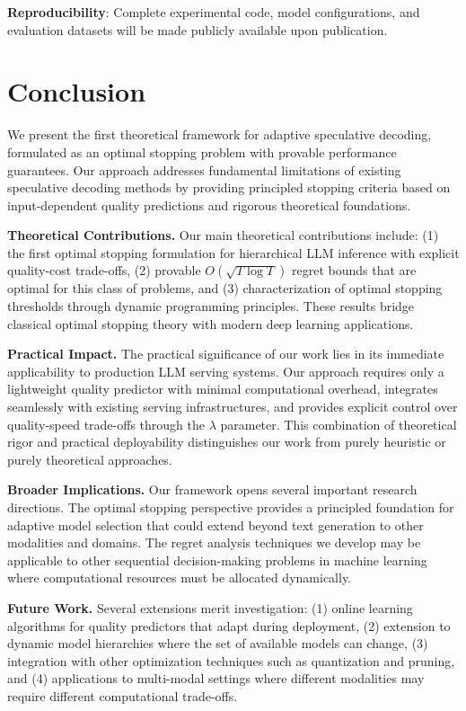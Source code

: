 \documentclass{article}
\theoremstyle{plain}
\theoremstyle{definition}
\theoremstyle{remark}
\begin{document}
\textbf{Reproducibility}: Complete experimental code, model configurations, and evaluation datasets will be made publicly available upon publication.



\section{Conclusion}
\label{sec:conclusion}
We present the first theoretical framework for adaptive speculative decoding, formulated as an optimal stopping problem with provable performance guarantees. Our approach addresses fundamental limitations of existing speculative decoding methods by providing principled stopping criteria based on input-dependent quality predictions and rigorous theoretical foundations.

\textbf{Theoretical Contributions.} Our main theoretical contributions include: (1) the first optimal stopping formulation for hierarchical LLM inference with explicit quality-cost trade-offs, (2) provable $O(\sqrt{T \log T})$ regret bounds that are optimal for this class of problems, and (3) characterization of optimal stopping thresholds through dynamic programming principles. These results bridge classical optimal stopping theory with modern deep learning applications.

\textbf{Practical Impact.} The practical significance of our work lies in its immediate applicability to production LLM serving systems. Our approach requires only a lightweight quality predictor with minimal computational overhead, integrates seamlessly with existing serving infrastructures, and provides explicit control over quality-speed trade-offs through the $\lambda$ parameter. This combination of theoretical rigor and practical deployability distinguishes our work from purely heuristic or purely theoretical approaches.

\textbf{Broader Implications.} Our framework opens several important research directions. The optimal stopping perspective provides a principled foundation for adaptive model selection that could extend beyond text generation to other modalities and domains. The regret analysis techniques we develop may be applicable to other sequential decision-making problems in machine learning where computational resources must be allocated dynamically.

\textbf{Future Work.} Several extensions merit investigation: (1) online learning algorithms for quality predictors that adapt during deployment, (2) extension to dynamic model hierarchies where the set of available models can change, (3) integration with other optimization techniques such as quantization and pruning, and (4) applications to multi-modal settings where different modalities may require different computational trade-offs.
\end{document}
